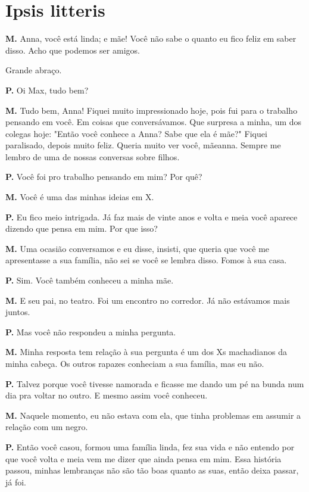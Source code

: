 \chapter{Ipsis litteris}

\textbf{M.} Anna, você está linda; e mãe! Você não sabe o quanto eu fico
feliz em saber disso. Acho que podemos ser amigos.

Grande abraço.

\textbf{P.} Oi Max, tudo bem?

\textbf{M.} Tudo bem, Anna! Fiquei muito impressionado hoje, pois fui
para o trabalho pensando em você. Em coisas que conversávamos. Que
surpresa a minha, um dos colegas hoje: "Então você conhece a Anna? Sabe
que ela é mãe?" Fiquei paralisado, depois muito feliz. Queria muito ver
você, mãeanna. Sempre me lembro de uma de nossas conversas sobre filhos.

\textbf{P.} Você foi pro trabalho pensando em mim? Por quê?

\textbf{M.} Você é uma das minhas ideias em X.

\textbf{P.} Eu fico meio intrigada. Já faz mais de vinte anos e volta e
meia você aparece dizendo que pensa em mim. Por que isso?

\textbf{M.} Uma ocasião conversamos e eu disse, insisti, que queria que
você me apresentasse a sua família, não sei se você se lembra disso.
Fomos à sua casa.

\textbf{P.} Sim. Você também conheceu a minha mãe.

\textbf{M.} E seu pai, no teatro. Foi um encontro no corredor. Já não
estávamos mais juntos.

\textbf{P.} Mas você não respondeu a minha pergunta.

\textbf{M.} Minha resposta tem relação à sua pergunta é um dos Xs
machadianos da minha cabeça. Os outros rapazes conheciam a sua família,
mas eu não.

\textbf{P.} Talvez porque você tivesse namorada e ficasse me dando um pé
na bunda num dia pra voltar no outro. E mesmo assim você conheceu.

\textbf{M.} Naquele momento, eu não estava com ela, que tinha problemas
em assumir a relação com um negro.

\textbf{P.} Então você casou, formou uma família linda, fez sua vida e
não entendo por que você volta e meia vem me dizer que ainda pensa em
mim. Essa história passou, minhas lembranças não são tão boas quanto as
suas, então deixa passar, já foi.

